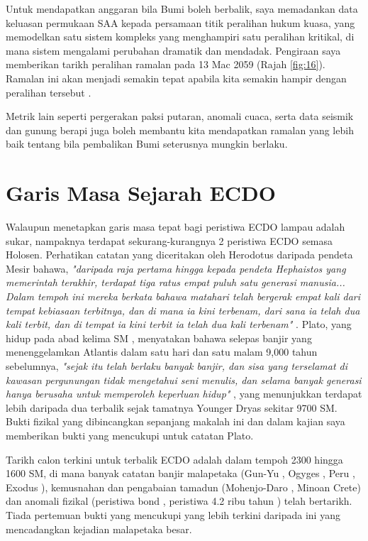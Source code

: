 \documentclass[10pt,twocolumn,letterpaper]{article}
\begin{document}
Untuk mendapatkan anggaran bila Bumi boleh berbalik, saya memadankan data keluasan permukaan SAA kepada persamaan titik peralihan hukum kuasa, yang memodelkan satu sistem kompleks yang menghampiri satu peralihan kritikal, di mana sistem mengalami perubahan dramatik dan mendadak. Pengiraan saya memberikan tarikh peralihan ramalan pada 13 Mac 2059 (Rajah \ref{fig:16}). Ramalan ini akan menjadi semakin tepat apabila kita semakin hampir dengan peralihan tersebut \cite{136}.

Metrik lain seperti pergerakan paksi putaran, anomali cuaca, serta data seismik dan gunung berapi juga boleh membantu kita mendapatkan ramalan yang lebih baik tentang bila pembalikan Bumi seterusnya mungkin berlaku.

\section{Garis Masa Sejarah ECDO}
Walaupun menetapkan garis masa tepat bagi peristiwa ECDO lampau adalah sukar, nampaknya terdapat sekurang-kurangnya 2 peristiwa ECDO semasa Holosen. Perhatikan catatan yang diceritakan oleh Herodotus daripada pendeta Mesir bahawa, \textit{"daripada raja pertama hingga kepada pendeta Hephaistos yang memerintah terakhir, terdapat tiga ratus empat puluh satu generasi manusia... Dalam tempoh ini mereka berkata bahawa matahari telah bergerak empat kali dari tempat kebiasaan terbitnya, dan di mana ia kini terbenam, dari sana ia telah dua kali terbit, dan di tempat ia kini terbit ia telah dua kali terbenam"} \cite{32}. Plato, yang hidup pada abad kelima SM \cite{111}, menyatakan bahawa selepas banjir yang menenggelamkan Atlantis dalam satu hari dan satu malam 9,000 tahun sebelumnya, \textit{"sejak itu telah berlaku banyak banjir, dan sisa yang terselamat di kawasan pergunungan tidak mengetahui seni menulis, dan selama banyak generasi hanya berusaha untuk memperoleh keperluan hidup"} \cite{112}, yang menunjukkan terdapat lebih daripada dua terbalik sejak tamatnya Younger Dryas sekitar 9700 SM. Bukti fizikal yang dibincangkan sepanjang makalah ini dan dalam kajian saya \cite{2} memberikan bukti yang mencukupi untuk catatan Plato.

Tarikh calon terkini untuk terbalik ECDO adalah dalam tempoh 2300 hingga 1600 SM, di mana banyak catatan banjir malapetaka (Gun-Yu \cite{113,114,115}, Ogyges \cite{116,117}, Peru \cite{118,119}, Exodus \cite{120}), kemusnahan dan pengabaian tamadun (Mohenjo-Daro \cite{121}, Minoan Crete\cite{100,101}) dan anomali fizikal (peristiwa bond \cite{122}, peristiwa 4.2 ribu tahun \cite{90}) telah bertarikh. Tiada pertemuan bukti yang mencukupi yang lebih terkini daripada ini yang mencadangkan kejadian malapetaka besar.
\end{document}
